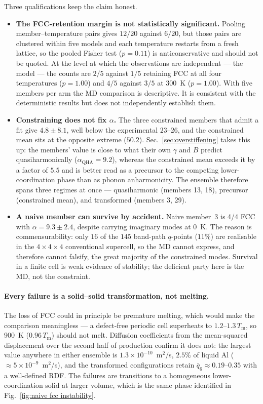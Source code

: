 \documentclass{article}
\begin{document}
Three qualifications keep the claim honest.

\begin{itemize}
  \item \textbf{The FCC-retention margin is not statistically significant.}
  Pooling member--temperature pairs gives $12/20$ against $6/20$, but those
  pairs are clustered within five models and each temperature restarts from a
  fresh lattice, so the pooled Fisher test ($p = 0.11$) is anticonservative and
  should not be quoted. At the level at which the observations are independent
  --- the model --- the counts are $2/5$ against $1/5$ retaining FCC at all four
  temperatures ($p = 1.00$) and $4/5$ against $3/5$ at 300~K ($p = 1.00$). With
  five members per arm the MD comparison is descriptive. It is consistent with
  the deterministic results but does not independently establish them.

  \item \textbf{Constraining does not fix $\alpha$.} The three constrained
  members that admit a fit give $4.8\pm8.1$, well below the experimental
  $23$--$26$, and the constrained mean sits at the opposite extreme ($50.2$).
  Sec.~\ref{sec:overstiffening} takes this up: the members' value is close to
  what their own $\gamma$ and $B$ predict quasiharmonically
  ($\alpha_{\mathrm{QHA}} = 9.2$), whereas the constrained mean exceeds it by a
  factor of $5.5$ and is better read as a precursor to the competing
  lower-coordination phase than as phonon anharmonicity. The ensemble therefore
  spans three regimes at once --- quasiharmonic (members 13, 18), precursor
  (constrained mean), and transformed (members 3, 29).

  \item \textbf{A naive member can survive by accident.} Naive member~3 is
  4/4 FCC with $\alpha = 9.3\pm2.4$, despite carrying imaginary modes at 0~K.
  The reason is commensurability: only $16$ of the $145$ band-path $q$-points
  ($11\%$) are realisable in the $4\times4\times4$ conventional supercell, so
  the MD cannot express, and therefore cannot falsify, the great majority of the
  constrained modes. Survival in a finite cell is weak evidence of stability;
  the deficient party here is the MD, not the constraint.
\end{itemize}

\paragraph{Every failure is a solid--solid transformation, not melting.} The
loss of FCC could in principle be premature melting, which would make the
comparison meaningless --- a defect-free periodic cell superheats to
$1.2$--$1.3\,T_{\mathrm m}$, so 900~K ($0.96\,T_{\mathrm m}$) should not melt.
Diffusion coefficients from the mean-squared displacement over the second half
of production confirm it does not: the largest value anywhere in either ensemble
is $1.3\times10^{-10}$~m$^2$/s, $2.5\%$ of liquid Al
($\approx5\times10^{-9}$~m$^2$/s), and the transformed configurations retain
$\bar q_6 \approx 0.19$--$0.35$ with a well-defined RDF. The failures are
transitions to a homogeneous lower-coordination solid at larger volume, which is
the same phase identified in Fig.~\ref{fig:naive fcc instability}.
\end{document}
